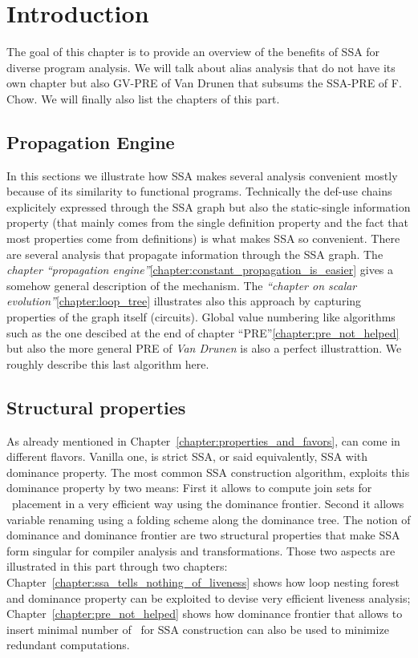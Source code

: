\chapter{Introduction }
\label{chapter:analysis}

The goal of this chapter is to provide an overview of the benefits of SSA for diverse program analysis.
We will talk about alias analysis that do not have its own chapter but also GV-PRE of Van Drunen that subsums the SSA-PRE of F. Chow.
We will finally also list the chapters of this part.

\section{Propagation Engine}
In this sections we illustrate how SSA makes several analysis convenient mostly because of its similarity to functional programs. 
Technically the def-use chains explicitely expressed through the SSA graph but also the static-single information property (that mainly comes from the single definition property and the fact that most properties come from definitions) is what makes SSA so convenient.
There are several analysis that propagate information through the SSA graph.
The \emph{chapter ``propagation engine''}\ref{chapter:constant_propagation_is_easier} gives a somehow general description of the mechanism.
The \emph{``chapter on scalar evolution''}\ref{chapter:loop_tree} illustrates also this approach by capturing properties of the graph itself (circuits).
Global value numbering like algorithms such as the one descibed at the end of chapter ``PRE''\ref{chapter:pre_not_helped} but also the more general PRE of \emph{Van Drunen} is also a perfect illustrattion.
We roughly describe this last algorithm here.

\section{Structural properties}
As already mentioned in Chapter~\ref{chapter:properties_and_favors}, can come in different flavors. 
Vanilla one, is strict SSA, or said equivalently, SSA with dominance property. 
The most common SSA construction algorithm, exploits this dominance property by two means: 
First it allows to compute join sets for \phifun\ placement in a very efficient way using the dominance frontier. 
Second it allows variable renaming using a folding scheme along the dominance tree. 
The notion of dominance and dominance frontier are two structural properties that make SSA form singular for compiler analysis and transformations. 
Those two aspects are illustrated in this part through two chapters: 
Chapter~\ref{chapter:ssa_tells_nothing_of_liveness} shows how loop nesting forest and dominance property can be exploited to devise very efficient liveness analysis;
Chapter~\ref{chapter:pre_not_helped} shows how dominance frontier that allows to insert minimal number of \phifun\ for SSA construction can also be used to minimize redundant computations.

